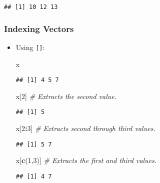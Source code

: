 \documentclass[
]{book}
\newenvironment{Shaded}{\begin{snugshade}}{\end{snugshade}}
\newcommand{\CommentTok}[1]{\textcolor[rgb]{0.56,0.35,0.01}{\textit{#1}}}
\newcommand{\DecValTok}[1]{\textcolor[rgb]{0.00,0.00,0.81}{#1}}
\newcommand{\KeywordTok}[1]{\textcolor[rgb]{0.13,0.29,0.53}{\textbf{#1}}}
\newcommand{\NormalTok}[1]{#1}
\newcommand{\OperatorTok}[1]{\textcolor[rgb]{0.81,0.36,0.00}{\textbf{#1}}}
\begin{document}
\begin{verbatim}
## [1] 10 12 13
\end{verbatim}

\hypertarget{indexing-vectors}{%
\subsubsection{Indexing Vectors}\label{indexing-vectors}}

\begin{itemize}
\item
  Using \texttt{{[}{]}}:

\begin{Shaded}
\begin{Highlighting}[]
\NormalTok{x}
\end{Highlighting}
\end{Shaded}

\begin{verbatim}
## [1] 4 5 7
\end{verbatim}

\begin{Shaded}
\begin{Highlighting}[]
\NormalTok{x[}\DecValTok{2}\NormalTok{] }\CommentTok{# Extracts the second value.}
\end{Highlighting}
\end{Shaded}

\begin{verbatim}
## [1] 5
\end{verbatim}

\begin{Shaded}
\begin{Highlighting}[]
\NormalTok{x[}\DecValTok{2}\OperatorTok{:}\DecValTok{3}\NormalTok{] }\CommentTok{# Extracts second through third values.}
\end{Highlighting}
\end{Shaded}

\begin{verbatim}
## [1] 5 7
\end{verbatim}

\begin{Shaded}
\begin{Highlighting}[]
\NormalTok{x[}\KeywordTok{c}\NormalTok{(}\DecValTok{1}\NormalTok{,}\DecValTok{3}\NormalTok{)] }\CommentTok{# Extracts the first and third values.}
\end{Highlighting}
\end{Shaded}

\begin{verbatim}
## [1] 4 7
\end{verbatim}


\end{itemize}
\end{document}
